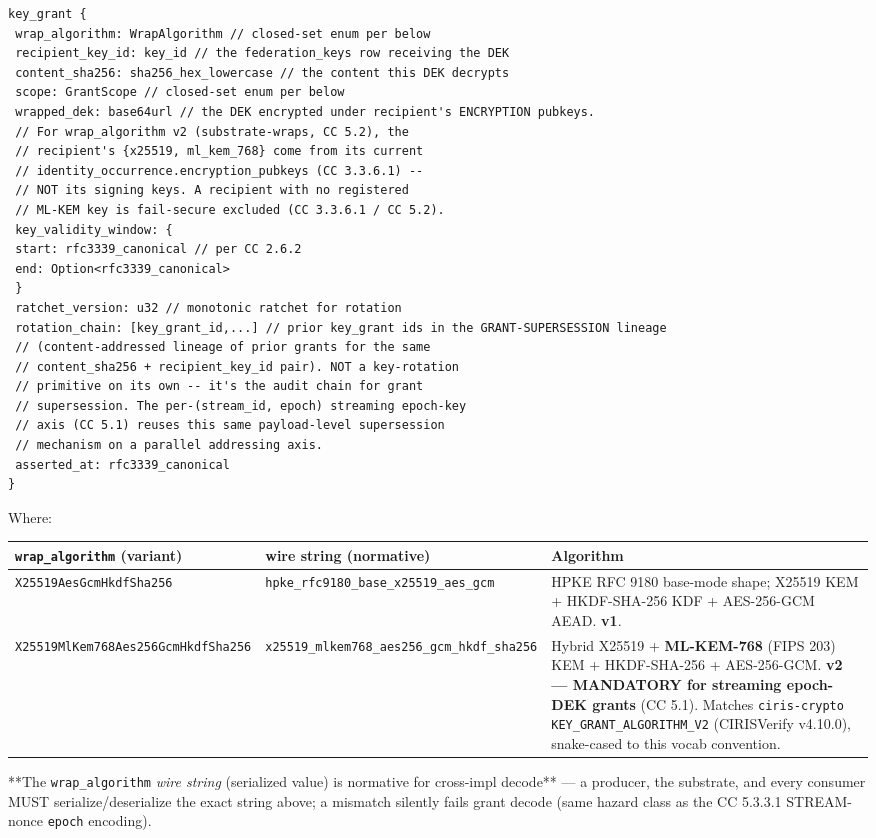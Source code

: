 \documentclass[11pt]{article}
\begin{document}
\begin{lstlisting}
key_grant {
 wrap_algorithm: WrapAlgorithm // closed-set enum per below
 recipient_key_id: key_id // the federation_keys row receiving the DEK
 content_sha256: sha256_hex_lowercase // the content this DEK decrypts
 scope: GrantScope // closed-set enum per below
 wrapped_dek: base64url // the DEK encrypted under recipient's ENCRYPTION pubkeys.
 // For wrap_algorithm v2 (substrate-wraps, CC 5.2), the
 // recipient's {x25519, ml_kem_768} come from its current
 // identity_occurrence.encryption_pubkeys (CC 3.3.6.1) --
 // NOT its signing keys. A recipient with no registered
 // ML-KEM key is fail-secure excluded (CC 3.3.6.1 / CC 5.2).
 key_validity_window: {
 start: rfc3339_canonical // per CC 2.6.2
 end: Option<rfc3339_canonical>
 }
 ratchet_version: u32 // monotonic ratchet for rotation
 rotation_chain: [key_grant_id,...] // prior key_grant ids in the GRANT-SUPERSESSION lineage
 // (content-addressed lineage of prior grants for the same
 // content_sha256 + recipient_key_id pair). NOT a key-rotation
 // primitive on its own -- it's the audit chain for grant
 // supersession. The per-(stream_id, epoch) streaming epoch-key
 // axis (CC 5.1) reuses this same payload-level supersession
 // mechanism on a parallel addressing axis.
 asserted_at: rfc3339_canonical
}
\end{lstlisting}

Where:


{\footnotesize
\begin{longtable}{|p{5.33cm}|p{5.33cm}|p{5.33cm}|}\hline
\textbf{\texttt{wrap\_algorithm} (variant)} & \textbf{wire string (normative)} & \textbf{Algorithm} \\ \hline\endhead
\texttt{X25519AesGcmHkdfSha256} & \texttt{hpke\_rfc9180\_base\_x25519\_aes\_gcm} & HPKE RFC 9180 base-mode shape; X25519 KEM + HKDF-SHA-256 KDF + AES-256-GCM AEAD. \textbf{v1}. \\ \hline
\texttt{X25519MlKem768Aes256GcmHkdfSha256} & \texttt{x25519\_mlkem768\_aes256\_gcm\_hkdf\_sha256} & Hybrid X25519 + \textbf{ML-KEM-768} (FIPS 203) KEM + HKDF-SHA-256 + AES-256-GCM. \textbf{v2 — MANDATORY for streaming epoch-DEK grants} (CC 5.1). Matches \texttt{ciris-crypto} \texttt{KEY\_GRANT\_ALGORITHM\_V2} (CIRISVerify v4.10.0), snake-cased to this vocab convention. \\ \hline
\end{longtable}}


**The \texttt{wrap\_algorithm} \textit{wire string} (serialized value) is normative for cross-impl decode** — a producer, the substrate, and every consumer MUST serialize/deserialize the exact string above; a mismatch silently fails grant decode (same hazard class as the CC 5.3.3.1 STREAM-nonce \texttt{epoch} encoding).
\end{document}
